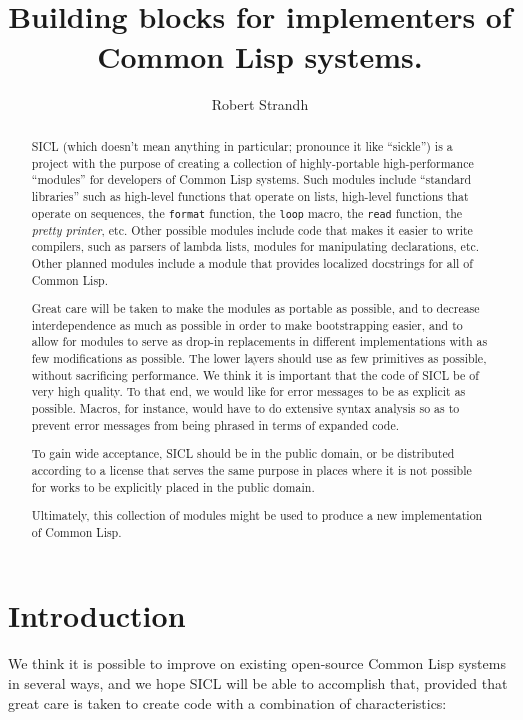 \documentclass{article}
\title{{\Huge \sysname{}}\\
Building blocks for implementers of\\Common Lisp systems.}
\author{Robert Strandh}
\def\sysname{SICL}
\begin{document}
\maketitle

\begin{abstract}
\sysname{} (which doesn't mean anything in particular; pronounce it
like ``sickle'') is a project with the purpose of creating a
collection of highly-portable high-performance ``modules'' for
developers of Common Lisp systems.  Such modules include ``standard
libraries'' such as high-level functions that operate on lists,
high-level functions that operate on sequences, the \texttt{format}
function, the \texttt{loop} macro, the \texttt{read} function, the
\emph{pretty printer}, etc.  Other possible modules include code that
makes it easier to write compilers, such as parsers of lambda lists,
modules for manipulating declarations, etc.  Other planned modules
include a module that provides localized docstrings for all of Common
Lisp. 

Great care will be taken to make the modules as portable as possible,
and to decrease interdependence as much as possible in order to make
bootstrapping easier, and to allow for modules to serve as drop-in
replacements in different implementations with as few modifications as
possible.  The lower layers should use as few primitives as
possible, without sacrificing performance.  We think it is important
that the code of \sysname{} be of very high quality.  To that end, we
would like for error messages to be as explicit as possible.  Macros,
for instance, would have to do extensive syntax analysis so as to
prevent error messages from being phrased in terms of expanded code.

To gain wide acceptance, \sysname{} should be in the public domain, or
be distributed according to a license that serves the same purpose in
places where it is not possible for works to be explicitly placed in
the public domain.

Ultimately, this collection of modules might be used to produce a new
implementation of Common Lisp.  
\end{abstract}

\section{Introduction}

We think it is possible to improve on existing open-source Common Lisp
systems in several ways, and we hope \sysname{} will be able to
accomplish that, provided that great care is taken to create code with
a combination of characteristics:
\end{document}
